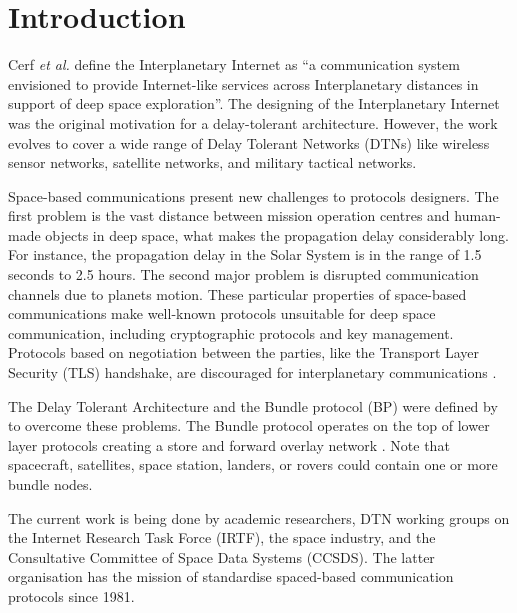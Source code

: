 \section{Introduction}

Cerf \textit{et al.} \cite{cerf2007delay} define the Interplanetary Internet as ``a communication system envisioned to provide Internet-like services across Interplanetary distances in support of deep space exploration''. The designing of the Interplanetary Internet was the original motivation for a delay-tolerant architecture. However, the work evolves to cover a wide range of Delay Tolerant Networks (DTNs) like wireless sensor networks, satellite networks, and military tactical networks. 

Space-based communications present new challenges to protocols designers. The first problem is the vast distance between mission operation centres and human-made objects in deep space, what makes the propagation delay considerably long. For instance, the propagation delay in the Solar System is in the range of 1.5 seconds to  2.5 hours. The second major problem is disrupted communication channels due to planets motion. These particular properties of space-based communications make well-known protocols unsuitable for deep space communication, including cryptographic protocols and key management.  Protocols based on negotiation between the parties, like the Transport Layer Security (TLS) handshake, are discouraged for interplanetary communications \cite{fall2003delay,cerf2007delay}.


The Delay Tolerant Architecture \cite{cerf2007delay} and the Bundle protocol (BP) \cite{scott2007bundle} were defined by to overcome these problems. The Bundle protocol operates on the top of lower layer protocols creating a store and forward overlay network \cite{ivancic2009security}. Note that spacecraft, satellites, space station, landers, or rovers could contain one or more bundle nodes.


The current work is being done by academic researchers, DTN working groups on the Internet Research Task Force (IRTF), the space industry, and the Consultative Committee of Space Data Systems (CCSDS). The latter organisation has the mission of standardise spaced-based communication protocols since 1981.


